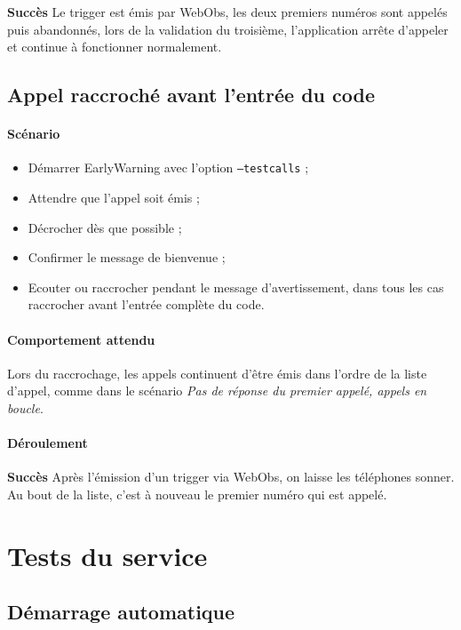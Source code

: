 \documentclass{article}
\begin{document}
\textbf{Succès} Le trigger est émis par WebObs, les deux premiers numéros sont appelés puis abandonnés, lors de la validation du troisième, l'application arrête d'appeler et continue à fonctionner normalement.

\subsection{Appel raccroché avant l'entrée du code}

\paragraph{Scénario}

\begin{itemize}
    \item Démarrer EarlyWarning avec l'option \texttt{--testcalls} ;
    \item Attendre que l'appel soit émis ;
    \item Décrocher dès que possible ;
    \item Confirmer le message de bienvenue ;
    \item Ecouter ou raccrocher pendant le message d'avertissement, dans tous les cas raccrocher avant l'entrée complète du code.
\end{itemize}

\paragraph{Comportement attendu\\}

Lors du raccrochage, les appels continuent d'être émis dans l'ordre de la liste d'appel, comme dans le scénario \emph{Pas de réponse du premier appelé, appels en boucle}.

\paragraph{Déroulement\\}

\textbf{Succès} Après l'émission d'un trigger via WebObs, on laisse les téléphones sonner. Au bout de la liste, c'est à nouveau le premier numéro qui est appelé. 

\section{Tests du service}

\subsection{Démarrage automatique}
\end{document}
